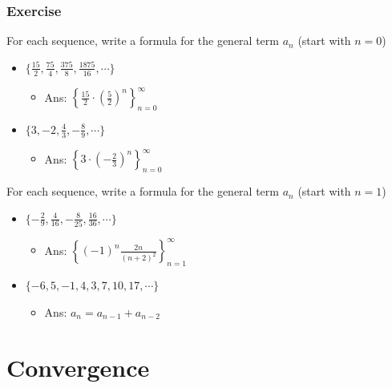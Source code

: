 \documentclass[t]{beamer}
\theoremstyle{plain}
\theoremstyle{definition}
\begin{document}
\begin{frame}
\frametitle{Exercise}

For each sequence, write a formula for the general term $a_n$ (start with $n=0$)

\begin{itemize}
	\item $\{\frac{15}{2}, \frac{75}{4}, \frac{375}{8}, \frac{1875}{16}, \cdots\}$
	\begin{itemize}
		\item Ans: $\left\{\frac{15}{2} \cdot (\frac{5}{2})^n\right\}_{n=0}^{\infty}$
	\end{itemize}
	\item $\{3, -2, \frac{4}{3}, -\frac{8}{9}, \cdots\}$
	\begin{itemize}
		\item Ans: $\left\{3\cdot (-\frac{2}{3})^n\right\}_{n=0}^{\infty}$
	\end{itemize}
\end{itemize}

For each sequence, write a formula for the general term $a_n$ (start with $n=1$)

\begin{itemize}
	\item $\{-\frac{2}{9}, \frac{4}{16}, -\frac{8}{25}, \frac{16}{36}, \cdots\}$
	\begin{itemize}
		\item Ans: $\left\{(-1)^n \frac{2n}{(n + 2)^2}\right\}_{n=1}^{\infty}$
	\end{itemize}
	\item $\{-6, 5, -1, 4, 3, 7, 10, 17, \cdots\}$
	\begin{itemize}
		\item Ans: $a_n = a_{n-1} + a_{n-2}$
	\end{itemize}
\end{itemize}

\end{frame}

\section{Convergence}
\end{document}

